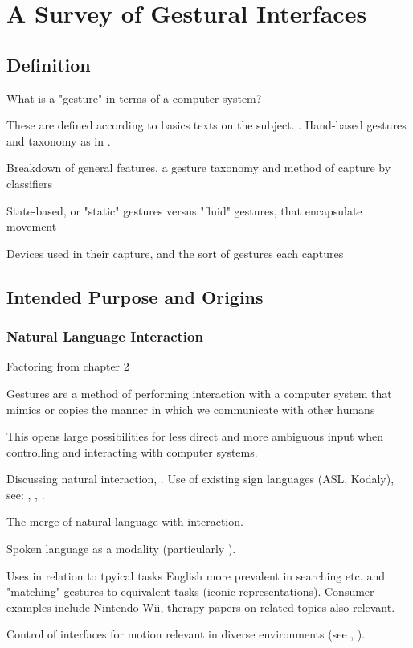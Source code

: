 \chapter{A Survey of Gestural Interfaces}
\label{cha:survey}

\section{Definition}

\begin{todoenv}
What is a "gesture" in terms of a computer system?

These are defined according to basics texts on the subject. \cite{WixonWigdor2010}. Hand-based gestures and taxonomy as in \cite{Cassel1998}. 

Breakdown of general features, a gesture taxonomy and method of capture by classifiers

State-based, or "static" gestures versus "fluid" gestures, that encapsulate movement

Devices used in their capture, and the sort of gestures each captures
\end{todoenv}

\section{Intended Purpose and Origins}

\subsection{Natural Language Interaction}

\begin{todoenv}
Factoring from chapter 2

Gestures are a method of performing interaction with a computer system that mimics or copies the manner in which we communicate with other humans

This opens large possibilities for less direct and more ambiguous input when controlling and interacting with computer systems.

Discussing natural interaction, \cite{Cassel1998}. Use of existing sign languages (ASL, Kodaly), see: \cite{LicsárEtAl2006}, \cite{IrvingEtAl1975}, \cite{Woodward1976}.

The merge of natural language with interaction.

Spoken language as a modality (particularly \cite{Bolt1980}).

Uses in relation to tpyical tasks
English more prevalent in searching etc. and "matching" gestures to equivalent tasks (iconic representations). Consumer examples include Nintendo Wii, therapy papers on related topics also relevant.

Control of interfaces for motion relevant in diverse environments (see \cite{RoseEtAl2011}, \cite{DongwookEtAl2014}).

\end{todoenv}

